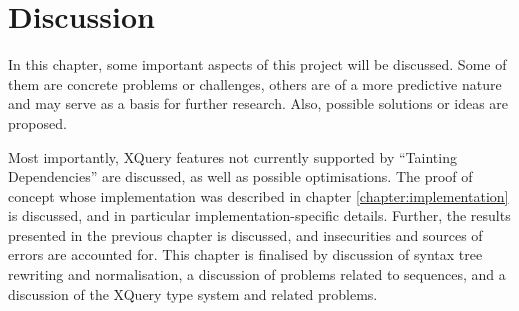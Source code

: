 \chapter{Discussion}
\label{chapter:discussion}
In this chapter, some important aspects of this project will be discussed. Some
of them are concrete problems or challenges, others are of a more predictive
nature and may serve as a basis for further research. Also, possible
solutions or ideas are proposed. 

Most importantly, XQuery features not
currently supported by ``Tainting Dependencies'' are discussed, as well as
possible optimisations. The proof of concept whose implementation was
described in chapter \ref{chapter:implementation} is discussed, and in
particular implementation-specific details. Further, the results presented in
the previous chapter is discussed, and insecurities and sources of errors are
accounted for. This chapter is finalised by discussion of syntax tree rewriting
and normalisation, a discussion of problems related to sequences, and a
discussion of the XQuery type system and related problems.








